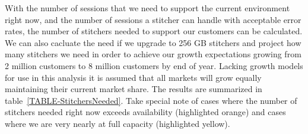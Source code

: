 \documentclass{article}
\begin{document}
With the number of sessions that we need to support the current environment right now, and the number of sessions a stitcher can handle with acceptable error rates, the number of stitchers needed to support our customers can be calculated. We can also cacluate the need if we upgrade to 256 GB stitchers and project how many stitchers we need in order to achieve our growth expectations growing from 2 million customers to 8 million customers by end of year. Lacking growth models for use in this analysis it is assumed that all markets will grow equally maintaining their current market share. The results are summarized in table~\ref{TABLE-StitchersNeeded}. Take special note of cases where the number of stitchers needed right now exceeds availability (highlighted orange) and cases where we are very nearly at full capacity (highlighted yellow). 
\end{document}
